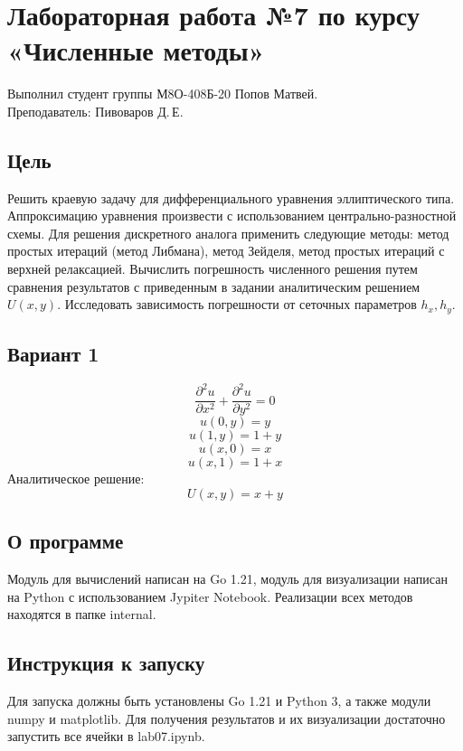 \documentclass{article}
\begin{document}
\section*{Лабораторная работа №7 по курсу «Численные методы»}

Выполнил студент группы М8О-408Б-20 Попов Матвей.
\\
Преподаватель: Пивоваров Д.\,Е.

\subsection*{Цель}

Решить краевую задачу для дифференциального уравнения эллиптического типа. 
Аппроксимацию уравнения произвести с использованием центрально-разностной 
схемы. Для решения дискретного аналога применить следующие методы: метод 
простых итераций (метод Либмана), метод Зейделя, метод простых итераций с 
верхней релаксацией. Вычислить погрешность численного решения путем сравнения 
результатов с приведенным в задании аналитическим решением $ U(x, y) $. 
Исследовать зависимость погрешности от сеточных параметров $ h_x, h_y $.

\subsection*{Вариант 1}
$$ \frac{\partial^2 u}{\partial x^2} + \frac{\partial^2 u}{\partial y^2} = 0 $$
$$ u(0, y) = y $$
$$ u(1, y) = 1 + y $$
$$ u(x, 0) = x $$
$$ u(x, 1) = 1 + x $$
Аналитическое решение: $$ U(x, y) = x + y $$

\subsection*{О программе}
Модуль для вычислений написан на Go 1.21, модуль для визуализации написан 
на Python с использованием Jypiter Notebook. Реализации всех методов находятся 
в папке internal.

\subsection*{Инструкция к запуску}
Для запуска должны быть установлены Go 1.21 и Python 3, а также модули numpy и 
matplotlib. Для получения результатов и их визуализации достаточно запустить 
все ячейки в lab07.ipynb.
\end{document}
